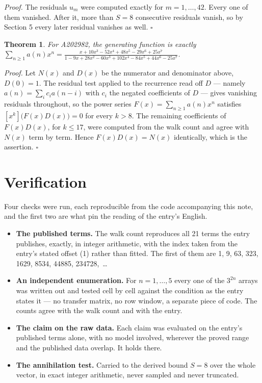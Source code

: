 \documentclass[11pt]{article}
\newtheorem{theorem}{Theorem}
\theoremstyle{definition}
\begin{document}
{\itshape Proof.} The residuals $u_m$ were computed exactly for $m = 1,\dots,42$. Every one of them vanished. After it, more than $S = 8$ consecutive residuals vanish, so by Section 5 every later residual vanishes as well. $\square$

\begin{theorem} For A202982, the generating function is exactly $\sum_{n\ge 1} a(n)x^n = \frac{x + 10x^{3} - 52x^{4} + 48x^{5} - 29x^{6} + 25x^{7}}{1 - 9x + 28x^{2} - 60x^{3} + 102x^{4} - 84x^{5} + 44x^{6} - 25x^{7}}$.\end{theorem}

{\itshape Proof.} Let $N(x)$ and $D(x)$ be the numerator and denominator above, $D(0)=1$. The residual test applied to the recurrence read off $D$ --- namely $a(n) = \sum_i c_i a(n-i)$ with $c_i$ the negated coefficients of $D$ --- gives vanishing residuals throughout, so the power series $F(x)=\sum_{n\ge 1}a(n)x^n$ satisfies $[x^k]\bigl(F(x)D(x)\bigr) = 0$ for every $k > 8$. The remaining coefficients of $F(x)D(x)$, for $k \le 17$, were computed from the walk count and agree with $N(x)$ term by term. Hence $F(x)D(x) = N(x)$ identically, which is the assertion. $\square$

\section{Verification}

Four checks were run, each reproducible from the code accompanying this note, and the first two are what pin the reading of the entry's English.

\begin{itemize}

\item {\bfseries The published terms.} The walk count reproduces all 21 terms the entry publishes, exactly, in integer arithmetic, with the index taken from the entry's stated offset (1) rather than fitted. The first of them are 1, 9, 63, 323, 1629, 8534, 44885, 234728,~\dots

\item {\bfseries An independent enumeration.} For $n = 1,\dots,5$ every one of the $3^{2n}$ arrays was written out and tested cell by cell against the condition as the entry states it --- no transfer matrix, no row window, a separate piece of code. The counts agree with the walk count and with the entry.

\item {\bfseries The claim on the raw data.} Each claim was evaluated on the entry's published terms alone, with no model involved, wherever the proved range and the published data overlap. It holds there.

\item {\bfseries The annihilation test.} Carried to the derived bound $S = 8$ over the whole vector, in exact integer arithmetic, never sampled and never truncated.

\end{itemize}
\end{document}

